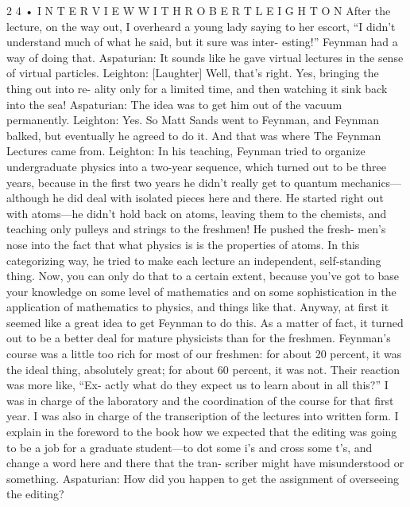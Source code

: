 \documentclass[10pt,oneside]{article}
\begin{document}
2 4 • I N T E R V I E W  W I T H  R O B E R T  L E I G H T O N After the lecture, on the way out, I overheard a young lady saying to her escort, “I didn’t understand much of what he said, but it sure was inter- esting!” Feynman had a way of doing that. Aspaturian: It sounds like he gave virtual lectures in the sense of virtual particles. Leighton: [Laughter] Well, that’s right. Yes, bringing the thing out into re- ality only for a limited time, and then watching it sink back into the sea! Aspaturian: The idea was to get him out of the vacuum permanently. Leighton: Yes. So Matt Sands went to Feynman, and Feynman balked, but eventually he agreed to do it. And that was where The Feynman Lectures came from. Leighton: In his teaching, Feynman tried to organize undergraduate physics into a two-year sequence, which turned out to be three years, because in the first two years he didn’t really get to quantum mechanics---although he did deal with isolated pieces here and there. He started right out with atoms---he didn’t hold back on atoms, leaving them to the chemists, and teaching only pulleys and strings to the freshmen! He pushed the fresh- men’s nose into the fact that what physics is is the properties of atoms. In this categorizing way, he tried to make each lecture an independent, self-standing thing. Now, you can only do that to a certain extent, because you’ve got to base your knowledge on some level of mathematics and on some sophistication in the application of mathematics to physics, and things like that. Anyway, at first it seemed like a great idea to get Feynman to do this. As a matter of fact, it turned out to be a better deal for mature physicists than for the freshmen. Feynman’s course was a little too rich for most of our freshmen: for about 20 percent, it was the ideal thing, absolutely great; for about 60 percent, it was not. Their reaction was more like, “Ex- actly what do they expect us to learn about in all this?” I was in charge of the laboratory and the coordination of the course for that first year. I was also in charge of the transcription of the lectures into written form. I explain in the foreword to the book how we expected that the editing was going to be a job for a graduate student---to dot some i’s and cross some t’s, and change a word here and there that the tran- scriber might have misunderstood or something. Aspaturian: How did you happen to get the assignment of overseeing the editing?\par
\end{document}
